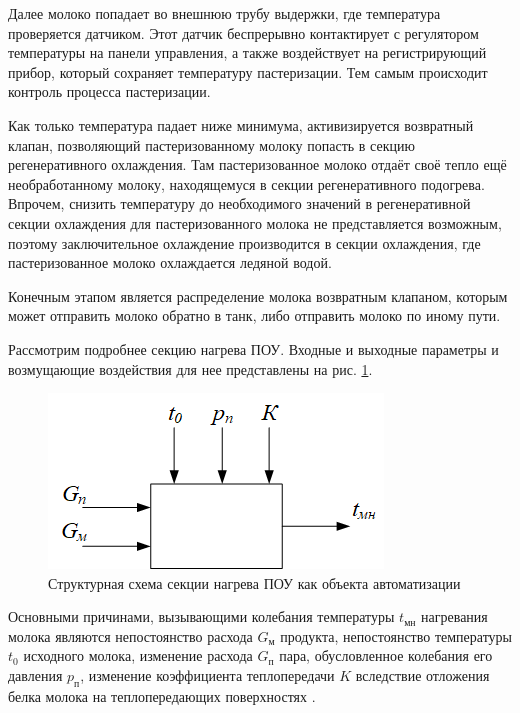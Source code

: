 Далее молоко попадает во внешнюю трубу выдержки, где температура проверяется датчиком. Этот датчик беспрерывно контактирует с регулятором температуры на панели управления, а также воздействует на регистрирующий прибор, который сохраняет температуру пастеризации. Тем самым происходит контроль процесса пастеризации.

Как только температура падает ниже минимума, активизируется возвратный клапан, позволяющий пастеризованному молоку попасть в секцию регенеративного охлаждения. Там пастеризованное молоко отдаёт своё тепло ещё необработанному молоку, находящемуся в секции регенеративного подогрева. Впрочем, снизить температуру до необходимого значений в регенеративной секции охлаждения для пастеризованного молока не представляется возможным, поэтому заключительное охлаждение производится в секции охлаждения, где пастеризованное молоко охлаждается ледяной водой.

Конечным этапом является распределение молока возвратным клапаном, которым может отправить молоко обратно в танк, либо отправить молоко по иному пути.

Рассмотрим подробнее секцию нагрева ПОУ. Входные и выходные параметры и возмущающие воздействия для нее представлены на рис. \ref{fig:Pasterizer_heat_section}.

\begin{figure}[H]
    \centering
    \includegraphics{images/chapter_2/Pasterizer_heat_section.png}
    \caption{Структурная схема секции нагрева ПОУ как объекта автоматизации}
    \label{fig:Pasterizer_heat_section}
\end{figure}

Основными причинами, вызывающими колебания температуры $t_\text{мн}$ нагревания молока являются непостоянство расхода $G_\text{м}$ продукта, непостоянство температуры $t_0$ исходного молока, изменение расхода $G_\text{п}$ пара, обусловленное колебания его давления $p_\text{п}$, изменение коэффициента теплопередачи $K$ вследствие отложения белка молока на теплопередающих поверхностях \cite{Вайнберг1978}.

